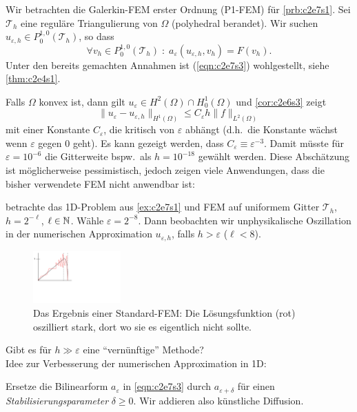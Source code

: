 \documentclass[../skript.tex]{subfiles}
\begin{document}
Wir betrachten die Galerkin-FEM erster Ordnung (P1-FEM) für \cref{prb:c2e7s1}. Sei $\mathcal{T}_h$ eine reguläre Triangulierung von $\Omega$ (polyhedral berandet). Wir suchen $u_{\varepsilon,h}\in P^{1,0}_0(\mathcal{T}_h)$, so dass 
\begin{equation}\label{eqn:c2e7s3}
	\forall v_h\in P^{1,0}_0(\mathcal{T}_h)\;:\; a_\varepsilon(u_{\varepsilon,h},v_h) = F(v_h).
\end{equation}
Unter den bereits gemachten Annahmen ist (\ref{eqn:c2e7s3}) wohlgestellt, siehe \cref{thm:c2e4s1}.\par
Falls $\Omega$ konvex ist, dann gilt $u_\varepsilon\in H^2(\Omega)\cap H^1_0(\Omega)$ und \cref{cor:c2e6s3} zeigt
\[
	\|u_\varepsilon-u_{\varepsilon,h}\|_{H^1(\Omega)} \leq C_\varepsilon h\|f\|_{L^2(\Omega)}
\]
mit einer Konstante $C_\varepsilon$, die kritisch von $\varepsilon$ abhängt (d.h.\ die Konstante wächst wenn $\varepsilon$ gegen 0 geht). Es kann gezeigt werden, dass $C_\varepsilon \equiv \varepsilon^{-3}$. Damit müsste für $\varepsilon = 10^{-6}$ die Gitterweite bspw.\ als $h = 10^{-18}$ gewählt werden. Diese Abschätzung ist möglicherweise pessimistisch, jedoch zeigen viele Anwendungen, dass die bisher verwendete FEM nicht anwendbar ist:
\begin{example}\label{ex:c2e7s2}
	betrachte das 1D-Problem aus \cref{ex:c2e7s1} und FEM auf uniformem Gitter $\mathcal{T}_h$, $h=2^{-\ell}$, $\ell\in\mathbb{N}$. Wähle $\varepsilon = 2^{-8}$. Dann beobachten wir unphysikalische Oszillation in der numerischen Approximation $u_{\varepsilon,h}$, falls $h > \varepsilon$ ($\ell < 8$).
	\begin{figure}[ht]
	\centering
		\includegraphics[width=0.3\textwidth]{Images/5-12-oszillation.pdf}
		\caption{Das Ergebnis einer Standard-FEM: Die Lösungsfunktion (rot) oszilliert stark, dort wo sie es eigentlich nicht sollte.}
		\label{figure_oszillation}
	\end{figure}
\end{example}
 Gibt es für $h \gg \varepsilon$ eine ``vernünftige'' Methode?\\
 Idee zur Verbesserung der numerischen Approximation in 1D:\par
 Ersetze die Bilinearform $a_\varepsilon$ in \cref{eqn:c2e7s3} durch $a_{\varepsilon+\delta}$ für einen \emph{Stabilisierungsparameter} $\delta \geq 0$. Wir addieren also künstliche Diffusion. 
\end{document}
